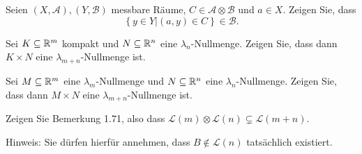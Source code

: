 \begin{Problem}
	\begin{parts}
		\item Seien $(X,\mathcal{A}), (Y,\mathcal{B})$ messbare R\"{a}ume, $C\in \mathcal{A}\otimes \mathcal{B}$ und $a\in X$. Zeigen Sie, dass
			\[
			\left\{ y\in Y|(a,y)\in C \right\} \in \mathcal{B}
			.\] 
		\item Sei $K\subseteq \mathbb{R}^m$ kompakt und $N\subseteq \mathbb{R}^n$ eine $\lambda_n$-Nullmenge. Zeigen Sie, dass dann $K\times N$ eine $\lambda_{m+n}$-Nullmenge ist.
		\item Sei $M\subseteq \mathbb{R}^m$ eine $\lambda_m$-Nullmenge und $N\subseteq \mathbb{R}^n$ eine $\lambda_n$-Nullmenge. Zeigen Sie, dass dann $M \times N$ eine $\lambda_{m+n}$-Nullmenge ist.
		\item Zeigen Sie Bemerkung 1.71, also dass $\mathcal{L}(m)\otimes \mathcal{L}(n)\subsetneq \mathcal{L}(m+n)$.

			{\footnotesize Hinweis: Sie dürfen hierfür annehmen, dass $B\not\in \mathcal{L}(n)$ tatsächlich existiert.}
	\end{parts}
\end{Problem}
